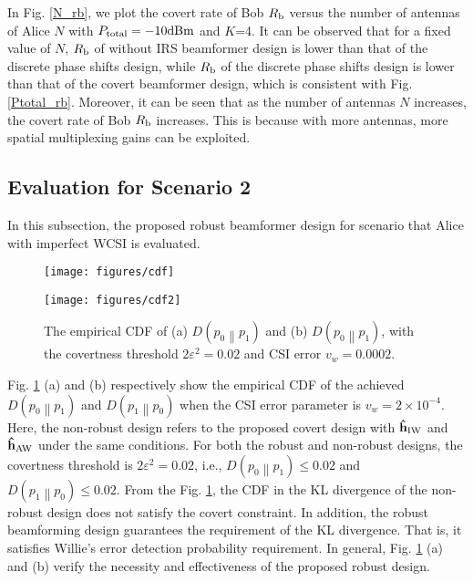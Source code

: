 \documentclass[10pt,journal,letterpaper,twocolumn,twoside]{IEEEtran} %
\begin{document}
In Fig.  \ref{N_rb}, we plot the covert rate of Bob $R_{\rm{b}}$ versus the   number of antennas of Alice $N$    with ${P_{{\rm{total}}}}=-10 \rm{dBm}$ and $K$=4. It can be observed that for a fixed value of $N$,
 $R_{\rm{b}}$ of without IRS beamformer design is lower than that of the  discrete phase shifts design,  while $R_{\rm{b}}$ of the  discrete phase shifts design is lower than that of the covert beamformer design, which is consistent with Fig. \ref{Ptotal_rb}.
Moreover, it can be seen that as the number of antennas $N$ increases, the covert rate of Bob $R_{\rm{b}}$ increases. This is because with more  antennas,  more   spatial multiplexing gains can be exploited.



%
%

\subsection{Evaluation for Scenario 2}
In this subsection, the proposed robust beamformer design for scenario that Alice with imperfect WCSI is evaluated.
%
\begin{figure}
    \begin{minipage}[b]{0.45\textwidth}
      \centering
      \texttt{[image: figures/cdf]}
      \vskip-0.2cm
    \end{minipage}
     \begin{minipage}[b]{0.45\textwidth}
      \centering
      \texttt{[image: figures/cdf2]}
      \vskip-0.2cm
    \end{minipage}\hfill
 \caption{The empirical CDF of (a) $D\left( {{p_0}\left\| {{p_1}} \right.} \right)$  and (b) $D\left( {{p_0}\left\| {{p_1}} \right.} \right)$, with the covertness threshold   $2{\varepsilon ^2} = 0.02$ and  CSI error   $v_w=0.0002$.}
 \label{cdf}  %
\end{figure}

Fig. \ref{cdf} (a) and (b) respectively show the empirical  CDF   of the achieved $D\left( {{p_0}\left\| {{p_1}} \right.} \right)$ and $D\left( {{p_1}\left\| {{p_0}} \right.} \right)$ when the CSI error parameter is $v_w={2} \times {{10}}^{{- 4}}$. Here, the non-robust design refers to the proposed covert design with ${{{\bf{\hat h}}}_{\rm{IW}}} $ and ${{{\bf{\hat h}}}_{\rm{AW}}} $ under the same conditions.
For both the robust and non-robust designs, the covertness threshold is $2{\varepsilon ^2} = 0.02$, i.e., $D\left( {{p_0}\left\| {{p_1}} \right.} \right) \le 0.02$ and $D\left( {{p_1}\left\| {{p_0}} \right.} \right) \le 0.02$.
From the Fig. \ref{cdf}, the CDF in the KL divergence of the non-robust design does not satisfy the covert  constraint. In addition, the robust beamforming design guarantees the requirement of the KL divergence. That is, it satisfies Willie's error detection probability requirement.
 In general, Fig. \ref{cdf} (a) and (b) verify     the necessity and effectiveness of the proposed robust design.
\end{document}
